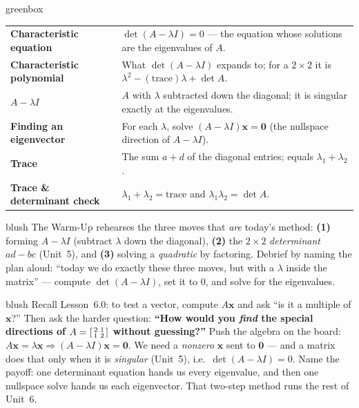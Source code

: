 \documentclass[10pt]{article}
\newcommand{\xx}{\mathbf{x}}
\newcommand{\zero}{\mathbf{0}}
\begin{document}
\begin{skillbox}{greenbox}
\renewcommand{\arraystretch}{1.3}
\begin{tabularx}{\linewidth}{@{}l X@{}}
\textbf{Characteristic equation} & $\det(A-\lambda I)=0$ --- the equation whose solutions are the eigenvalues of $A$. \\
\textbf{Characteristic polynomial} & What $\det(A-\lambda I)$ expands to; for a $2\times2$ it is $\lambda^2-(\text{trace})\lambda+\det A$. \\
\textbf{$A-\lambda I$} & $A$ with $\lambda$ subtracted down the diagonal; it is singular exactly at the eigenvalues. \\
\textbf{Finding an eigenvector} & For each $\lambda$, solve $(A-\lambda I)\xx=\zero$ (the nullspace direction of $A-\lambda I$). \\
\textbf{Trace} & The sum $a+d$ of the diagonal entries; equals $\lambda_1+\lambda_2$. \\
\textbf{Trace \& determinant check} & $\lambda_1+\lambda_2=\text{trace}$ and $\lambda_1\lambda_2=\det A$. \\
\end{tabularx}
\end{skillbox}

\begin{fixedskillbox}{blush}
    The Warm-Up rehearses the three moves that \emph{are} today's method:
    \textbf{(1)} forming $A-\lambda I$ (subtract $\lambda$ down the diagonal),
    \textbf{(2)} the $2\times2$ \emph{determinant} $ad-bc$ (Unit~5), and
    \textbf{(3)} solving a \emph{quadratic} by factoring. Debrief by naming the plan aloud: ``today we
    do exactly these three moves, but with a $\lambda$ inside the matrix'' --- compute
    $\det(A-\lambda I)$, set it to $0$, and solve for the eigenvalues.
\end{fixedskillbox}

\begin{skillbox}[Hook]{blush}
    Recall Lesson~6.0: to test a vector, compute $A\xx$ and ask ``is it a multiple of $\xx$?'' Then
    ask the harder question: \textbf{``How would you \emph{find} the special directions of
    $A=\begin{bsmallmatrix}2&1\\1&2\end{bsmallmatrix}$ without guessing?''} Push the algebra on the
    board: $A\xx=\lambda\xx\Rightarrow(A-\lambda I)\xx=\zero$. We need a \emph{nonzero} $\xx$ sent to
    $\zero$ --- and a matrix does that only when it is \emph{singular} (Unit~5), i.e.\
    $\det(A-\lambda I)=0$. Name the payoff: one determinant equation hands us every eigenvalue, and
    then one nullspace solve hands us each eigenvector. That two-step method runs the rest of Unit~6.
\end{skillbox}
\end{document}
